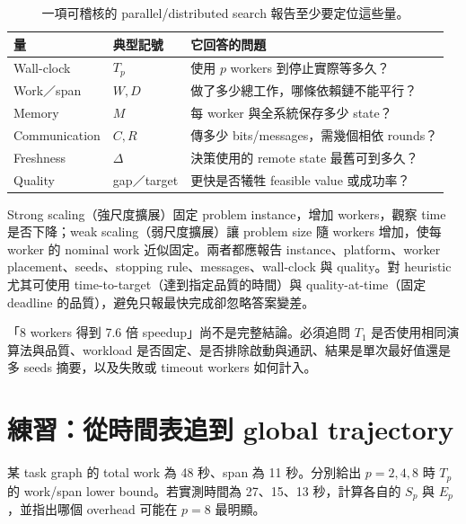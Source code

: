 \documentclass[11pt,a4paper,oneside,openany]{book}
\begin{document}
\begin{table}[htbp]
\centering
\caption{一項可稽核的 parallel/distributed search 報告至少要定位這些量。}
\begin{tabularx}{\textwidth}{@{}p{}p{}Y@{}}
\toprule
量 & 典型記號 & 它回答的問題 \\
\midrule
Wall-clock & $T_p$ & 使用 $p$ workers 到停止實際等多久？ \\
Work／span & $W,D$ & 做了多少總工作，哪條依賴鏈不能平行？ \\
Memory & $M$ & 每 worker 與全系統保存多少 state？ \\
Communication & $C,R$ & 傳多少 bits/messages，需幾個相依 rounds？ \\
Freshness & $\Delta$ & 決策使用的 remote state 最舊可到多久？ \\
Quality & gap／target & 更快是否犧牲 feasible value 或成功率？ \\
\bottomrule
\end{tabularx}
\label{tab:parallel-metrics}
\end{table}

Strong scaling（強尺度擴展）固定 problem instance，增加 workers，觀察 time 是否下降；weak scaling（弱尺度擴展）讓 problem size 隨 workers 增加，使每 worker 的 nominal work 近似固定。兩者都應報告 instance、platform、worker placement、seeds、stopping rule、messages、wall-clock 與 quality。對 heuristic 尤其可使用 time-to-target（達到指定品質的時間）與 quality-at-time（固定 deadline 的品質），避免只報最快完成卻忽略答案變差。

\begin{misconception}
「8 workers 得到 7.6 倍 speedup」尚不是完整結論。必須追問 $T_1$ 是否使用相同演算法與品質、workload 是否固定、是否排除啟動與通訊、結果是單次最好值還是多 seeds 摘要，以及失敗或 timeout workers 如何計入。
\end{misconception}

\section{練習：從時間表追到 global trajectory}

\begin{exercise}
某 task graph 的 total work 為 48 秒、span 為 11 秒。分別給出 $p=2,4,8$ 時 $T_p$ 的 work/span lower bound。若實測時間為 27、15、13 秒，計算各自的 $S_p$ 與 $E_p$，並指出哪個 overhead 可能在 $p=8$ 最明顯。
\end{exercise}
\end{document}

